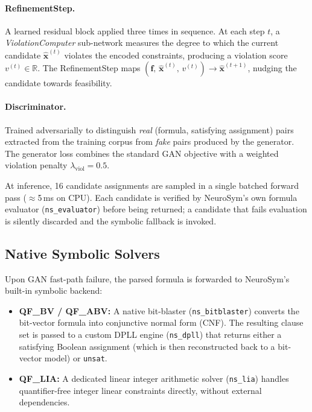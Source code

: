 \documentclass[10pt,a4paper]{article}
\begin{document}
\paragraph{RefinementStep.}  A learned residual block applied three times in
sequence.  At each step $t$, a \emph{ViolationComputer} sub-network measures
the degree to which the current candidate $\hat{\mathbf{x}}^{(t)}$ violates
the encoded constraints, producing a violation score $v^{(t)} \in
\mathbb{R}$.  The RefinementStep maps
$(\mathbf{f},\, \hat{\mathbf{x}}^{(t)},\, v^{(t)}) \to
 \hat{\mathbf{x}}^{(t+1)}$, nudging the candidate towards feasibility.

\paragraph{Discriminator.}  Trained adversarially to distinguish
\emph{real} (formula, satisfying assignment) pairs extracted from the
training corpus from \emph{fake} pairs produced by the generator.  The
generator loss combines the standard GAN objective with a weighted
violation penalty $\lambda_{\mathrm{viol}} = 0.5$.

At inference, 16 candidate assignments are sampled in a single batched
forward pass ($\approx$5\,ms on CPU).  Each candidate is verified by
NeuroSym's own formula evaluator (\texttt{ns\_evaluator}) before being
returned; a candidate that fails evaluation is silently discarded and the
symbolic fallback is invoked.

\subsection{Native Symbolic Solvers}

Upon GAN fast-path failure, the parsed formula is forwarded to NeuroSym's
built-in symbolic backend:

\begin{itemize}
  \item \textbf{QF\_BV / QF\_ABV:}  A native bit-blaster (\texttt{ns\_bitblaster})
        converts the bit-vector formula into conjunctive normal form (CNF).
        The resulting clause set is passed to a custom DPLL engine
        (\texttt{ns\_dpll}) that returns either a satisfying Boolean
        assignment (which is then reconstructed back to a bit-vector model)
        or \texttt{unsat}.
  \item \textbf{QF\_LIA:}  A dedicated linear integer arithmetic solver
        (\texttt{ns\_lia}) handles quantifier-free integer linear constraints
        directly, without external dependencies.
\end{itemize}
\end{document}
